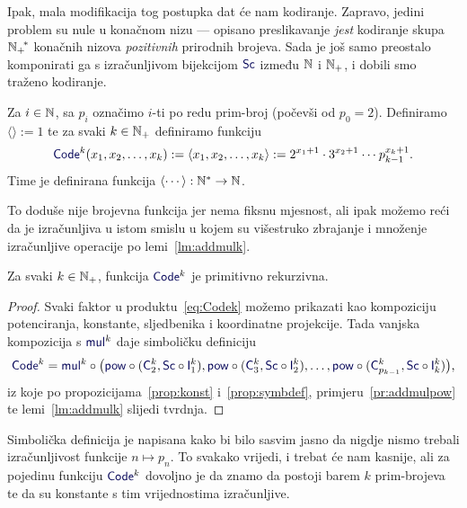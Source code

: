 Ipak, mala modifikacija tog postupka dat će nam kodiranje. Zapravo, jedini problem su nule u konačnom nizu --- opisano preslikavanje \emph{jest} kodiranje skupa ${{\mathbb N}_+\!}^*$ konačnih nizova \emph{pozitivnih} prirodnih brojeva. Sada je još samo preostalo komponirati ga s izračunljivom bijekcijom $\f{Sc}$ između ${\mathbb N}$ i ${\mathbb N}_+$, i dobili smo traženo kodiranje.

\begin{definicija}[{name=[kodiranje konačnih nizova prirodnih brojeva]}]
Za $i\in{\mathbb N}$, sa $p_i$ označimo $i$-ti po redu prim-broj (počevši od $p_0=2$). Definiramo $\langle\rangle:=1$ te za svaki $k\in{\mathbb N}_+$ definiramo funkciju
\begin{equation}\label{eq:Codek}
    \f{Code}^k(x_1,x_2,\dotsc,x_k):=\langle x_1,x_2,\dotsc,x_k\rangle:=2^{x_1+1}\cdot3^{x_2+1}\mathbin{\dotsm}p_{k-1}^{x_k+1}\text.
\end{equation}
Time je definirana funkcija $\langle\cdots\rangle:{\mathbb N}^*\to{\mathbb N}$.
\end{definicija}

To doduše nije brojevna funkcija jer nema fiksnu mjesnost, ali ipak možemo reći da je izračunljiva u istom smislu u kojem su višestruko zbrajanje i množenje izračunljive operacije po lemi~\ref{lm:addmulk}.

\begin{propozicija}[{name=[primitivna rekurzivnost kodiranja konačnih nizova]}]\label{prop:Codekprn}
Za svaki $k\in{\mathbb N}_+$, funkcija $\f{Code}^k$ je primitivno rekurzivna.
\end{propozicija}
\begin{proof}
    Svaki faktor u produktu~\eqref{eq:Codek} možemo prikazati kao kompoziciju potenciranja, konstante, sljedbenika i koordinatne projekcije. Tada vanjska kompozicija s $\f{mul}^k$ daje simboličku definiciju
    \begin{equation}\f{Code}^k=\f{mul}^k\circ\bigl(\f{pow}\circ(\f C_2^k,\f{Sc}\circ\f I_1^k),\f{pow}\circ(\f C_3^k,\f{Sc}\circ\f I_2^k),\dotsc,\f{pow}\circ(\f C_{p_{k-1}}^k,\f{Sc}\circ\f I_k^k)\bigr)\text,
    \end{equation}
    iz koje po propozicijama~\ref{prop:konst} i~\ref{prop:symbdef}, primjeru~\ref{pr:addmulpow} te lemi~\ref{lm:addmulk} slijedi tvrdnja.
\end{proof}

Simbolička definicija je napisana kako bi bilo sasvim jasno da nigdje nismo trebali izračunljivost funkcije $n\mapsto p_n$. To svakako vrijedi, i trebat će nam kasnije, ali za pojedinu funkciju $\f{Code}^k$ dovoljno je da znamo da postoji barem $k$ prim-brojeva te da su konstante s tim vrijednostima izračunljive.

